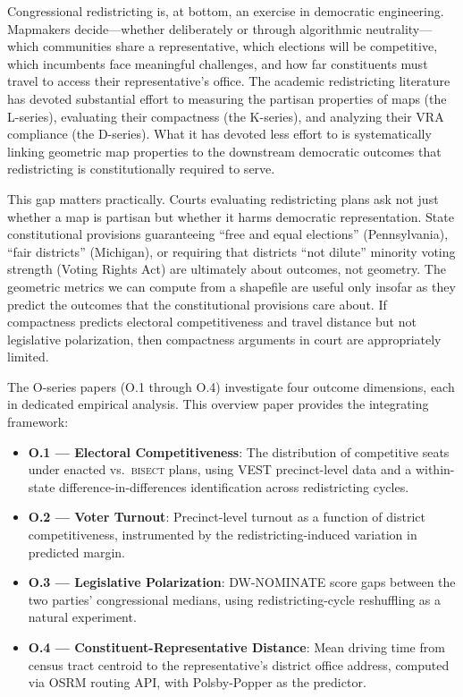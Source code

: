 \label{sec:introduction}

Congressional redistricting is, at bottom, an exercise in democratic engineering.
Mapmakers decide---whether deliberately or through algorithmic neutrality---which communities
share a representative, which elections will be competitive, which incumbents face meaningful
challenges, and how far constituents must travel to access their representative's office.
The academic redistricting literature has devoted substantial effort to measuring the partisan
properties of maps (the L-series), evaluating their compactness (the K-series), and analyzing
their VRA compliance (the D-series). What it has devoted less effort to is systematically
linking geometric map properties to the downstream democratic outcomes that redistricting is
constitutionally required to serve.

This gap matters practically. Courts evaluating redistricting plans ask not just whether a
map is partisan but whether it harms democratic representation. State constitutional provisions
guaranteeing ``free and equal elections'' (Pennsylvania), ``fair districts'' (Michigan), or
requiring that districts ``not dilute'' minority voting strength (Voting Rights Act) are
ultimately about outcomes, not geometry. The geometric metrics we can compute from a shapefile
are useful only insofar as they predict the outcomes that the constitutional provisions care about.
If compactness predicts electoral competitiveness and travel distance but not legislative
polarization, then compactness arguments in court are appropriately limited.

The O-series papers (O.1 through O.4) investigate four outcome dimensions, each in dedicated
empirical analysis. This overview paper provides the integrating framework:

\begin{itemize}
\item \textbf{O.1 --- Electoral Competitiveness}: The distribution of competitive seats under
  enacted vs.\ \textsc{bisect} plans, using VEST precinct-level data and a within-state
  difference-in-differences identification across redistricting cycles.
\item \textbf{O.2 --- Voter Turnout}: Precinct-level turnout as a function of district
  competitiveness, instrumented by the redistricting-induced variation in predicted margin.
\item \textbf{O.3 --- Legislative Polarization}: DW-NOMINATE score gaps between the two
  parties' congressional medians, using redistricting-cycle reshuffling as a natural
  experiment.
\item \textbf{O.4 --- Constituent-Representative Distance}: Mean driving time from census
  tract centroid to the representative's district office address, computed via OSRM
  routing API, with Polsby-Popper as the predictor.
\end{itemize}

